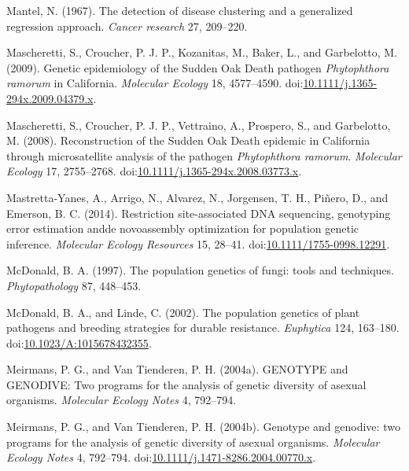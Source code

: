 \documentclass[double,12pt]{beavtex}
\begin{document}
  \hypertarget{ref-mantel1967detection}{}
  Mantel, N. (1967). The detection of disease clustering and a generalized
  regression approach. \emph{Cancer research} 27, 209--220.
  
  \hypertarget{ref-mascheretti2009genetic}{}
  Mascheretti, S., Croucher, P. J. P., Kozanitas, M., Baker, L., and
  Garbelotto, M. (2009). Genetic epidemiology of the Sudden Oak Death
  pathogen \emph{Phytophthora ramorum} in California. \emph{Molecular
  Ecology} 18, 4577--4590.
  doi:\href{https://doi.org/10.1111/j.1365-294x.2009.04379.x}{10.1111/j.1365-294x.2009.04379.x}.
  
  \hypertarget{ref-mascheretti2008reconstruction}{}
  Mascheretti, S., Croucher, P. J. P., Vettraino, A., Prospero, S., and
  Garbelotto, M. (2008). Reconstruction of the Sudden Oak Death epidemic
  in California through microsatellite analysis of the pathogen
  \emph{Phytophthora ramorum}. \emph{Molecular Ecology} 17, 2755--2768.
  doi:\href{https://doi.org/10.1111/j.1365-294x.2008.03773.x}{10.1111/j.1365-294x.2008.03773.x}.
  
  \hypertarget{ref-mastretta2015restriction}{}
  Mastretta-Yanes, A., Arrigo, N., Alvarez, N., Jorgensen, T. H., Piñero,
  D., and Emerson, B. C. (2014). Restriction site-associated DNA
  sequencing, genotyping error estimation andde novoassembly optimization
  for population genetic inference. \emph{Molecular Ecology Resources} 15,
  28--41.
  doi:\href{https://doi.org/10.1111/1755-0998.12291}{10.1111/1755-0998.12291}.
  
  \hypertarget{ref-mcdonald1997population}{}
  McDonald, B. A. (1997). The population genetics of fungi: tools and
  techniques. \emph{Phytopathology} 87, 448--453.
  
  \hypertarget{ref-Mcdonald2002}{}
  McDonald, B. A., and Linde, C. (2002). The population genetics of plant
  pathogens and breeding strategies for durable resistance.
  \emph{Euphytica} 124, 163--180.
  doi:\href{https://doi.org/10.1023/A:1015678432355}{10.1023/A:1015678432355}.
  
  \hypertarget{ref-meirmans2004genotype}{}
  Meirmans, P. G., and Van Tienderen, P. H. (2004a). GENOTYPE and
  GENODIVE: Two programs for the analysis of genetic diversity of asexual
  organisms. \emph{Molecular Ecology Notes} 4, 792--794.
  
  \hypertarget{ref-genodive}{}
  Meirmans, P. G., and Van Tienderen, P. H. (2004b). Genotype and
  genodive: two programs for the analysis of genetic diversity of asexual
  organisms. \emph{Molecular Ecology Notes} 4, 792--794.
  doi:\href{https://doi.org/10.1111/j.1471-8286.2004.00770.x}{10.1111/j.1471-8286.2004.00770.x}.
  
\end{document}
